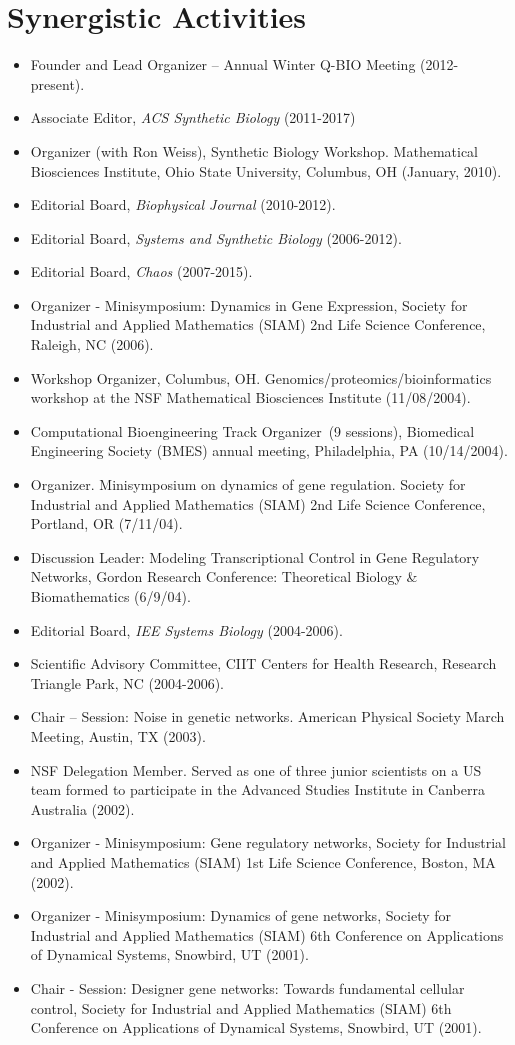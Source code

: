 \documentclass[11pt,a4paper,sans]{moderncv}        %
\begin{document}
\section{Synergistic Activities}
\begin{itemize}
\item Founder and Lead Organizer -- Annual Winter Q-BIO Meeting (2012-present). 
\item Associate Editor, {\em ACS Synthetic Biology} (2011-2017)
\item Organizer (with Ron Weiss), Synthetic Biology Workshop.  Mathematical Biosciences Institute, Ohio State University, Columbus, OH (January, 2010).  
\item Editorial Board, {\em Biophysical Journal} (2010-2012). 
\item Editorial Board, {\em Systems and Synthetic Biology} (2006-2012).
\item Editorial Board, {\em Chaos} (2007-2015).
\item Organizer - Minisymposium: Dynamics in Gene Expression, Society for Industrial
and Applied Mathematics (SIAM) 2nd Life Science Conference, Raleigh,
NC (2006).
\item Workshop Organizer, Columbus, OH. Genomics/proteomics/bioinformatics
workshop at the NSF Mathematical Biosciences Institute (11/08/2004).
\item Computational Bioengineering Track Organizer~(9 sessions), Biomedical Engineering Society (BMES) annual meeting, Philadelphia, PA (10/14/2004).
\item Organizer.  Minisymposium on dynamics of gene regulation.
Society for Industrial and Applied Mathematics (SIAM) 2nd Life
Science Conference, Portland, OR (7/11/04).
\item Discussion Leader: Modeling Transcriptional Control in Gene Regulatory Networks,
Gordon Research Conference: Theoretical Biology \& Biomathematics
(6/9/04).
\item Editorial Board, {\em IEE Systems Biology} (2004-2006).
\item Scientific Advisory Committee, CIIT Centers for Health
Research, Research Triangle Park, NC (2004-2006).
\item Chair -- Session: Noise in genetic networks. American Physical
Society March Meeting, Austin, TX (2003).
\item NSF Delegation Member. Served as one of three junior scientists
on a US team formed to participate in the Advanced Studies
Institute in Canberra Australia (2002).
\item Organizer - Minisymposium: Gene regulatory networks, Society for Industrial
and Applied Mathematics (SIAM) 1st Life Science Conference,
Boston, MA (2002).
\item Organizer - Minisymposium: Dynamics of gene networks, Society for Industrial and
Applied Mathematics (SIAM) 6th Conference on Applications of
Dynamical Systems, Snowbird, UT (2001).
\item Chair - Session: Designer gene networks: Towards fundamental cellular control,
Society for Industrial and Applied Mathematics (SIAM) 6th
Conference on Applications of Dynamical Systems, Snowbird, UT
(2001).
\end{itemize}
\end{document}

